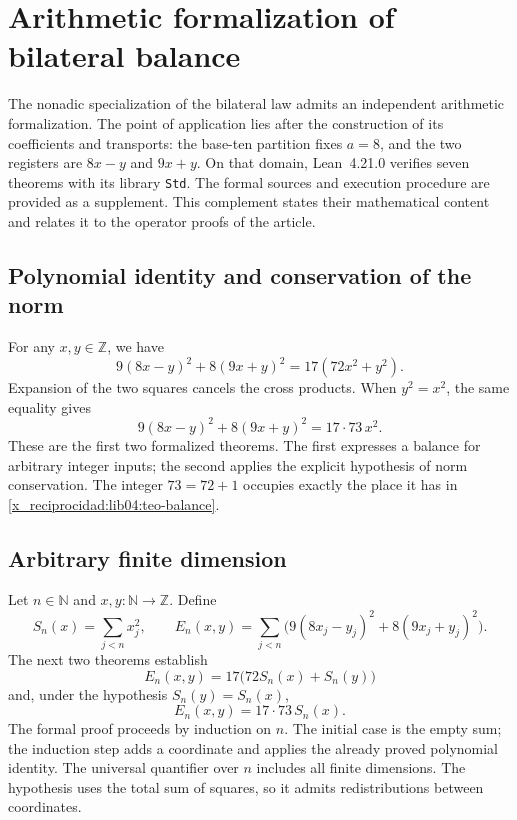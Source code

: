 \chapter*{Arithmetic formalization of bilateral balance}
\label{x_reciprocidad:libro:formalizacion-lean}

The nonadic specialization of the bilateral law admits an independent arithmetic
formalization. The point of application lies after the
construction of its coefficients and transports: the base-ten partition fixes
\(a=8\), and the two registers are \(8x-y\) and \(9x+y\). On that domain,
Lean~4.21.0 verifies seven theorems with its library \texttt{Std}. The formal
sources and execution procedure are provided as a supplement.
This complement states their mathematical content and relates it to
the operator proofs of the article.

\section*{Polynomial identity and conservation of the norm}

For any \(x,y\in\mathbb Z\), we have
\[
 9(8x-y)^2+8(9x+y)^2=17(72x^2+y^2).
\]
Expansion of the two squares cancels the cross products. When
\(y^2=x^2\), the same equality gives
\[
 9(8x-y)^2+8(9x+y)^2=17\cdot73\,x^2.
\]
These are the first two formalized theorems. The first expresses a
balance for arbitrary integer inputs; the second applies the explicit
hypothesis of norm conservation. The integer \(73=72+1\) occupies
exactly the place it has in \cref{x_reciprocidad:lib04:teo-balance}.

\section*{Arbitrary finite dimension}

Let \(n\in\mathbb N\) and \(x,y:\mathbb N\to\mathbb Z\). Define
\[
 S_n(x)=\sum_{j<n}x_j^2,
 \qquad
 E_n(x,y)=\sum_{j<n}\bigl(9(8x_j-y_j)^2+8(9x_j+y_j)^2\bigr).
\]
The next two theorems establish
\[
 E_n(x,y)=17\bigl(72S_n(x)+S_n(y)\bigr)
\]
and, under the hypothesis \(S_n(y)=S_n(x)\),
\[
 E_n(x,y)=17\cdot73\,S_n(x).
\]
The formal proof proceeds by induction on \(n\). The initial case is the
empty sum; the induction step adds a coordinate and applies the already proved
polynomial identity. The universal quantifier over \(n\) includes
all finite dimensions. The hypothesis uses the total sum of
squares, so it admits redistributions between coordinates.

